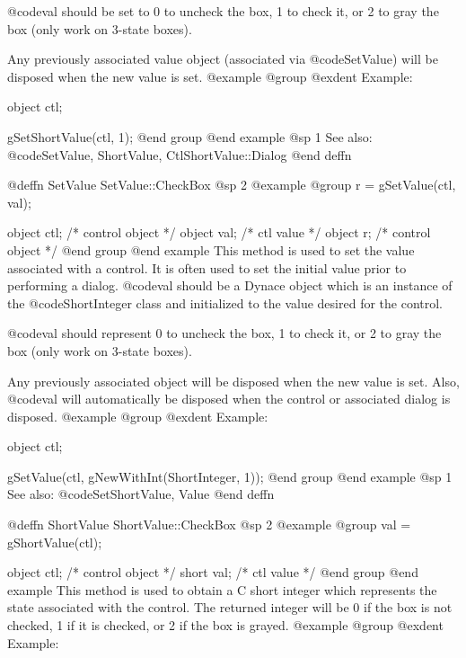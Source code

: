 {@code{val} should be set to 0 to uncheck the box, 1 to check it, or 2 to
gray the box (only work on 3-state boxes).

Any previously associated value object (associated via @code{SetValue})
will be disposed when the new value is set.
@example
@group
@exdent Example:

object  ctl;

gSetShortValue(ctl, 1);
@end group
@end example
@sp 1
See also:  @code{SetValue, ShortValue, CtlShortValue::Dialog}
@end deffn
















@deffn {SetValue} SetValue::CheckBox
@sp 2
@example
@group
r = gSetValue(ctl, val);

object  ctl;    /*  control object  */
object  val;    /*  ctl value       */
object  r;      /*  control object  */
@end group
@end example
This method is used to set the value associated with a control.  It is
often used to set the initial value prior to performing a dialog.
@code{val} should be a Dynace object which is an instance of the
@code{ShortInteger} class and initialized to the value desired for the
control.

@code{val} should represent 0 to uncheck the box, 1 to check it, or 2 to
gray the box (only work on 3-state boxes).

Any previously associated object will be disposed when the new value is set.
Also, @code{val} will automatically be disposed when the control or associated
dialog is disposed.
@example
@group
@exdent Example:

object  ctl;

gSetValue(ctl, gNewWithInt(ShortInteger, 1));
@end group
@end example
@sp 1
See also:  @code{SetShortValue, Value}
@end deffn













@deffn {ShortValue} ShortValue::CheckBox
@sp 2
@example
@group
val = gShortValue(ctl);

object  ctl;   /*  control object  */
short   val;   /*  ctl value       */
@end group
@end example
This method is used to obtain a C short integer which represents the
state associated with the control.  The returned integer will be 0 if
the box is not checked, 1 if it is checked, or 2 if the box is grayed.
@example
@group
@exdent Example:

}
